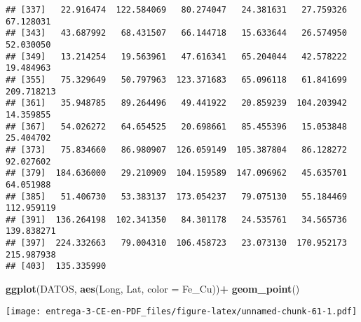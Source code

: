 \documentclass[
]{article}
\newenvironment{Shaded}{\begin{snugshade}}{\end{snugshade}}
\newcommand{\DataTypeTok}[1]{\textcolor[rgb]{0.13,0.29,0.53}{#1}}
\newcommand{\DecValTok}[1]{\textcolor[rgb]{0.00,0.00,0.81}{#1}}
\newcommand{\KeywordTok}[1]{\textcolor[rgb]{0.13,0.29,0.53}{\textbf{#1}}}
\newcommand{\NormalTok}[1]{#1}
\newcommand{\OperatorTok}[1]{\textcolor[rgb]{0.81,0.36,0.00}{\textbf{#1}}}
\newcommand{\StringTok}[1]{\textcolor[rgb]{0.31,0.60,0.02}{#1}}
\begin{document}
\begin{verbatim}
## [337]   22.916474  122.584069   80.274047   24.381631   27.759326   67.128031
## [343]   43.687992   68.431507   66.144718   15.633644   26.574950   52.030050
## [349]   13.214254   19.563961   47.616341   65.204044   42.578222   19.484963
## [355]   75.329649   50.797963  123.371683   65.096118   61.841699  209.718213
## [361]   35.948785   89.264496   49.441922   20.859239  104.203942   14.359855
## [367]   54.026272   64.654525   20.698661   85.455396   15.053848   25.404702
## [373]   75.834660   86.980907  126.059149  105.387804   86.128272   92.027602
## [379]  184.636000   29.210909  104.159589  147.096962   45.635701   64.051988
## [385]   51.406730   53.383137  173.054237   79.075130   55.184469  112.959119
## [391]  136.264198  102.341350   84.301178   24.535761   34.565736  139.838271
## [397]  224.332663   79.004310  106.458723   23.073130  170.952173  215.987938
## [403]  135.335990
\end{verbatim}

\begin{Shaded}
\begin{Highlighting}[]
\KeywordTok{ggplot}\NormalTok{(DATOS, }\KeywordTok{aes}\NormalTok{(Long, Lat, }\DataTypeTok{color =}\NormalTok{ Fe_Cu))}\OperatorTok{+}
\StringTok{  }\KeywordTok{geom_point}\NormalTok{()}
\end{Highlighting}
\end{Shaded}

\texttt{[image: entrega-3-CE-en-PDF\_files/figure-latex/unnamed-chunk-61-1.pdf]}

\begin{Shaded}
\end{Shaded}
\end{document}
